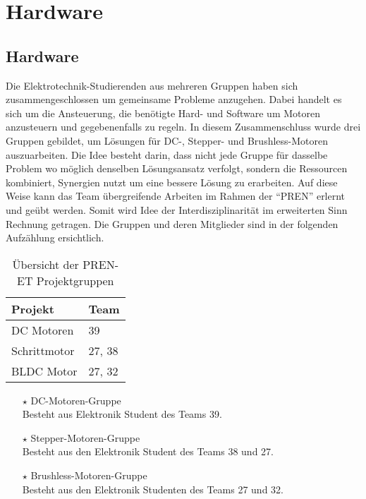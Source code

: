 \ifSTANDALONE
\section{Hardware}
\fi
\ifEMBED
\subsection{Hardware}
\fi
Die Elektrotechnik-Studierenden aus mehreren Gruppen haben sich
zusammengeschlossen um gemeinsame Probleme anzugehen. Dabei handelt es sich
um die Ansteuerung, die benötigte Hard- und Software um Motoren anzusteuern
und gegebenenfalls zu regeln. In diesem Zusammenschluss wurde drei Gruppen
gebildet, um Lösungen für DC-, Stepper- und Brushless-Motoren auszuarbeiten.
Die Idee besteht darin, dass nicht jede Gruppe für dasselbe Problem wo
möglich denselben Lösungsansatz verfolgt, sondern die Ressourcen kombiniert,
Synergien nutzt um eine bessere Lösung zu erarbeiten. Auf diese Weise kann
das Team übergreifende Arbeiten im Rahmen der \enquote{PREN} erlernt und
geübt werden. Somit wird Idee der Interdisziplinarität im erweiterten Sinn
Rechnung getragen. Die Gruppen und deren Mitglieder sind in der folgenden
Aufzählung ersichtlich.

\ifSTANDALONE
	\begin{table}[h!]
		\centering
		\begin{tabular}{l l}
			Projekt		& Team \\
			\hline
			DC Motoren	& 39 \\
			Schrittmotor	& 27, 38 \\
			BLDC Motor	& 27, 32 \\
		\end{tabular}
		\caption{Übersicht der PREN-ET Projektgruppen}
		\label{tab:pren-et-overview}
	\end{table}
\fi

\ifEMBED
    \begin{itemize}
        \item[$\star$] DC-Motoren-Gruppe\\
            Besteht aus Elektronik Student des Teams 39.
        \item[$\star$] Stepper-Motoren-Gruppe\\
            Besteht aus den Elektronik Student des Teams 38 und 27.
        \item[$\star$] Brushless-Motoren-Gruppe\\
            Besteht aus den Elektronik Studenten des Teams 27 und 32.
    \end{itemize}
\fi
